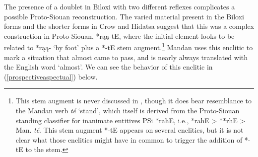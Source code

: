 The presence of a doublet in Biloxi with two different reflexes complicates a possible Proto-Siouan reconstruction. The varied material present in the Biloxi forms and the shorter forms in Crow and Hidatsa suggest that this was a complex construction in Proto-Siouan, *rąą-tE, where the initial element looks to be related to *rąą- `by foot' plus a *-tE stem augment.\footnote{This stem augment is never discussed in \citet{rankin2015}, though it does bear resemblance to the Mandan verb \textit{té} `stand', which itself is derived from the Proto-Siouan standing classifier for inanimate entitives PSi *rahE, i.e., *rahE > **rhE > Man. \textit{té}. This stem augment *-tE appears on several enclitics, but it is not clear what those enclitics might have in common to trigger the addition of *-tE to the stem.} Mandan uses this enclitic to mark a situation that almost came to pass, and is nearly always translated with the English word `almost'. We can see the behavior of this enclitic in (\ref{prospectiveaspectual}) below.

